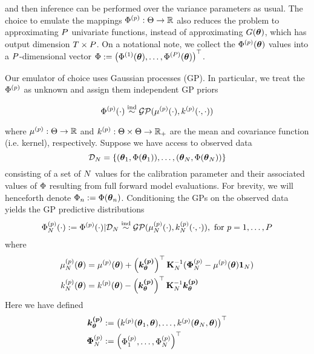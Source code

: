 \documentclass[12pt]{article}
\begin{document}
and then inference can be performed over the variance parameters as usual. The choice to emulate the mappings $\Phi^{(p)}: \Theta \to \mathbb{R}$ also reduces the problem to 
approximating $P$ univariate functions, instead of approximating $G(\boldsymbol{\theta})$, which has output dimension $T \times P$. On a notational note, we collect the $\Phi^{(p)}(\boldsymbol{\theta})$ values into a $P$-dimensional 
vector $\Phi := \begin{pmatrix} \Phi^{(1)}(\boldsymbol{\theta}), \dots, \Phi^{(P)}(\boldsymbol{\theta}) \end{pmatrix}^\top$.  

Our emulator of choice uses Gaussian processes (GP). In particular, we treat the $\Phi^{(p)}$ as unknown and assign them independent GP priors

\[\Phi^{(p)}(\cdot) \overset{\text{ind}}{\sim} \mathcal{GP}(\mu^{(p)}(\cdot), k^{(p)}(\cdot, \cdot))\] 

where $\mu^{(p)}: \Theta \to \mathbb{R}$ and $k^{(p)}: \Theta \times \Theta \to \mathbb{R}_+$ are the mean and covariance function (i.e. kernel), respectively. 
Suppose we have access to observed data 
\[\mathcal{D}_{N} = \left\{(\boldsymbol{\theta}_1, \Phi(\boldsymbol{\theta}_1)), \dots, (\boldsymbol{\theta}_{N}, \Phi(\boldsymbol{\theta}_{N})) \right\}\]
consisting of a set of $N$ values for the calibration parameter and their associated values of $\Phi$ resulting from full forward model evaluations. For brevity, we will henceforth denote 
$\Phi_{n} := \Phi(\boldsymbol{\theta}_{n})$. Conditioning the GPs on the observed data yields the GP predictive distributions
\begin{align} 
\Phi_{N}^{(p)}(\cdot) := \Phi^{(p)}(\cdot)|\mathcal{D}_{N} \overset{\text{ind}}{\sim} \mathcal{GP}(\mu_{N}^{(p)}(\cdot), k_{N}^{(p)}(\cdot, \cdot)), \text{ for } p = 1, \dots, P
\end{align}
where 
\begin{align}
\mu_{N}^{(p)}(\boldsymbol{\theta}) &= \mu^{(p)}(\boldsymbol{\theta}) + \left(\boldsymbol{k^{(p)}_{\boldsymbol{\theta}}}\right)^\top \mathbf{K}_{N}^{-1} (\boldsymbol{\Phi}_{N}^{(p)} - \mu^{(p)}(\boldsymbol{\theta}) \boldsymbol{1}_{N}) \\ 
k_{N}^{(p)}(\boldsymbol{\theta}) &= k^{(p)}(\boldsymbol{\theta}) - \left(\boldsymbol{k^{(p)}_{\boldsymbol{\theta}}}\right)^\top \mathbf{K}_{N}^{-1} \boldsymbol{k^{(p)}_{\boldsymbol{\theta}}}
\end{align}
Here we have defined 
\begin{align}
\boldsymbol{k^{(p)}_{\boldsymbol{\theta}}} &:= \begin{pmatrix} k^{(p)}(\boldsymbol{\theta}_1, \boldsymbol{\theta}), \dots, k^{(p)}(\boldsymbol{\theta}_{N}, \boldsymbol{\theta})  \end{pmatrix}^\top \\ 
\boldsymbol{\Phi}_{N}^{(p)} &:= \begin{pmatrix} \Phi_{1}^{(p)}, \dots, \Phi_{N}^{(p)} \end{pmatrix}^{\top}
\end{align}
\end{document}
